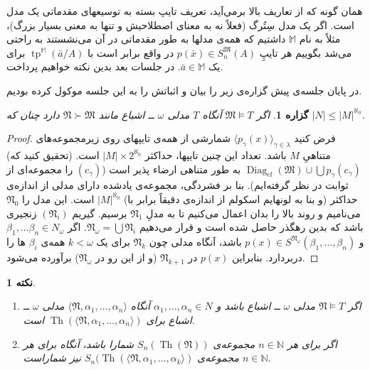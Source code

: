 \documentclass[12pt,a4paper]{report}
\theoremstyle{colorhead}
\newtheorem{prop}[thm]{گزاره}
\newtheorem{nokte}[thm]{نکته}
\DeclareMathOperator{\Th}{Th}
\DeclareMathOperator{\diag}{Diag}
\DeclareMathOperator{\tp}{tp}
\begin{document}
همان گونه که از تعاریف بالا برمی‌آید، 
تعریف تایپ
بسته به توسیعهای مقدماتی یک مدل است. 
اگر یک مدل سِتُرگ (فعلاً 
نه به معنای اصطلاحیش و تنها به معنی
بسیار بزرگ)، مثلاً به نام
$\mathbb{M}$
داشتیم که همه‌ی مدلها به طور مقدماتی در آن می‌نشستند به راحتی
می‌شد بگوییم 
هر تایپِ
$p(\bar{x})\in S^\mathfrak{M}_n(A)$
در واقع برابر است با
$\tp^\mathbb{M}(\bar{a}/A)$
برای یک
$\bar{a}\in \mathbb{M}$.
در جلسات بعد بدین نکته خواهیم پرداخت. 
\par 
در پایان جلسه‌ی پیش گزاره‌ی زیر را بیان و اثباتش را به این جلسه موکول کرده‌ بودیم.
\begin{prop}
\label{eshba'sizekuchak}
اگر
$\mathfrak{M}\models T$
آنگاه 
$T$
مدلی
$\omega$
ــ
اشباع مانند
$\mathfrak{N}\succ \mathfrak{M}$
دارد چنان که
$|N|\leq |M|^{\aleph_0}$.
\end{prop}
\begin{proof}
فرض کنید
$\langle p_\gamma(x)\rangle_{\gamma\in \lambda}$
شمارشی از همه‌ی تایپهای روی زیرمجموعه‌های متناهیِ
$M$
باشد. تعداد این چنین تایپها، حداکثر
$|M|\times 2^{\aleph_0}$
است. (تحقیق کنید که)
$\diag_{el}(\mathfrak{M})\cup \bigcup p_\gamma(c_\gamma)$
به طور متناهی ارضاء پذیر است ($(c_\gamma)$ را مجموعه‌ای از ثوابت در نظر گرفته‌ایم).
بنا بر فشردگی، مجموعه‌ی یادشده دارای مدلی از اندازه‌ی حداکثر (و بنا به لونهایم اسکولم از اندازه‌ی دقیقاً برابر با)
$|M|^{\aleph_0}$
است. این مدل را
$\mathfrak{N}_0$
می‌نامیم و روند بالا را بدان اعمال می‌کنیم تا به مدلِ
$\mathfrak{N}_1$
برسیم. گیریم
$(\mathfrak{N}_i)$
زنجیری باشد که بدین رهگذر حاصل شده است و قرار می‌دهیم
$\mathfrak{N}_\omega=\bigcup \mathfrak{N}_i$.
اگر
$\beta_1,\ldots\beta_n\in N_\omega$
و
$p(x)\in S^{\mathfrak{N}_\omega}(\beta_1,\ldots,\beta_n)$
باشد، آنگاه مدلی چون
$\mathfrak{N}_k$
برای یک
$k<\omega$
همه‌ی
$\beta_i$
ها را دربردارد. بنابراین
$p(x)$
در
$\mathfrak{N}_{k+1}$
(و از این رو در
$\mathfrak{N}_\omega$)
برآورده می‌شود. 
\end{proof}
\begin{nokte}
\hfill
\begin{enumerate}
\item
اگر
$\mathfrak{N}\models T$
مدلی
$\omega$
ــ
اشباع باشد و 
$\alpha_1,\ldots,\alpha_n\in N$
آنگاه
$\langle \mathfrak{N},\alpha_1,\ldots,\alpha_n\rangle$
مدلی 
$\omega$
ــ 
اشباع برای
$\Th(\langle \mathfrak{N},\alpha_1,\ldots,\alpha_n\rangle)$
است. 
\item 
اگر برای هر
$n\in \mathbb{N}$
مجموعه‌ی
$S_n(\Th(\mathfrak{N}))$
شمارا باشد،‌
آنگاه 
برای هر
$n\in \mathbb{N}$
مجموعه‌ی
$S_n(\Th(\langle \mathfrak{N},\alpha_1,\ldots,\alpha_k\rangle)$
نیز شماراست.
\end{enumerate}
\end{nokte}
\end{document}
